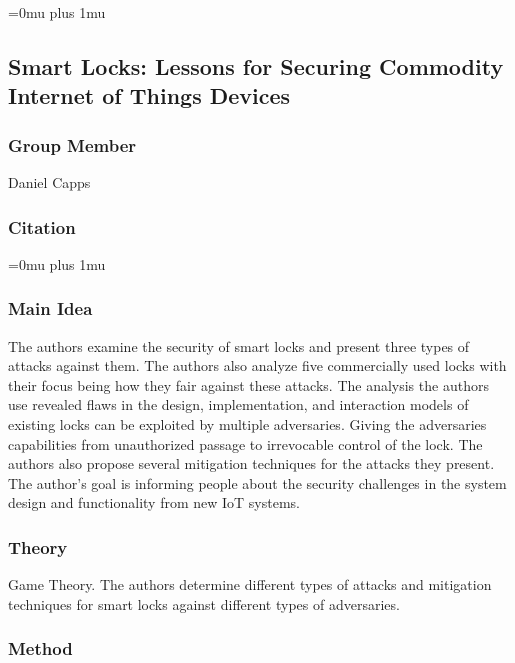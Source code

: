 \Urlmuskip=0mu plus 1mu\relax

\subsection{{S}mart {L}ocks: {L}essons for {S}ecuring {C}ommodity {I}nternet of  {T}hings  {D}evices}

\subsubsection{Group Member}

\noindent
Daniel Capps

\noindent
\subsubsection{Citation}

\Urlmuskip=0mu plus 1mu\relax


\subsubsection{Main Idea}

\noindent
The authors examine the security of smart locks and present three types of attacks against them. The authors also analyze five commercially used locks with their focus being how they fair against these attacks. The analysis the authors use revealed flaws in the design, implementation, and interaction models of existing locks can be exploited by multiple adversaries. Giving the adversaries capabilities from unauthorized passage to irrevocable control of the lock. The authors also propose several mitigation techniques for the attacks they present. The author’s goal is informing people about the security challenges in the system design and functionality from new IoT systems.  

\subsubsection{Theory}

\noindent
Game Theory. The authors determine different types of attacks and mitigation techniques for smart locks against different types of adversaries.

\subsubsection{Method}


